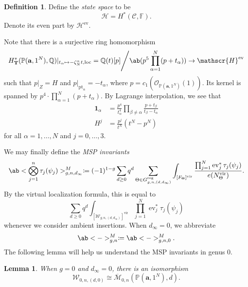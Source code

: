 \documentclass[10pt]{amsart}
\newtheorem{lem}[thm]{Lemma}
\theoremstyle{definition}
\newtheorem{defn}[thm]{Definition}
\theoremstyle{remark}
\theoremstyle{plain}
\theoremstyle{definition}
\theoremstyle{remark}
\newcommand{\Q}{\mathbb{Q}}
\newcommand{\F}{\mathbb{F}}
\newcommand{\ba}{\mathbf{a}}
\renewcommand{\P}{\mathbb{P}}
\newcommand{\mc}[1]{\mathcal{#1}}
\newcommand{\msc}[1]{\mathscr{#1}}
\newcommand{\T}{\mathbf{T}}
\newcommand{\mbf}[1]{\mathbf{#1}}
\newcommand{\mr}[1]{\mathrm{#1}}
\newcommand{\ol}[1]{\overline{#1}}
\newcommand{\1}{\mathbf{1}}
\newcommand{\2}{\mathbf{2}}
\newcommand{\3}{\mathbf{3}}
\newcommand{\vir}{\mr{vir}}
\newcommand{\pt}{\mr{pt}}
\newcommand{\loc}{\mr{loc}}
\DeclareMathOperator{\ev}{ev}
\numberwithin{equation}{section}
\begin{document}
\begin{defn}
    Define the \textit{state space} to be
    \[ \msc{H} = H^*(\mc{C}, \F). \]
    Denote its even part by $\msc{H}^{\ev}$.
\end{defn}

Note that there is a surjective ring homomorphism
\[ H_{\T}^*(\P(\ba, 1^N), \Q)|_{t_{\alpha} \mapsto -\zeta_N^{\alpha}t, \loc} = \Q(t)[p]\Bigg/\ab(p^5 \prod_{\alpha=1}^N (p+t_{\alpha})) \to \msc{H}^{\ev} \]
such that $p|_{Z} = H$ and $p|_{\pt_{\alpha}} = -t_{\alpha}$, where $p = c_1(\msc{O}_{\P(\ba, 1^N)}(1))$. Its kernel is spanned by $p^4 \cdot \prod_{\alpha=1}^N (p+t_{\alpha})$. By Lagrange interpolation, we see that
\begin{align*}
    \mbf{1}_{\alpha} &= \frac{p^4}{t_{\alpha}^4} \prod_{\beta \neq \alpha} \frac{p+t_{\beta}}{t_{\beta} - t_{\alpha}} \\
    H^j &= \frac{p^j}{t^N} (t^N - p^N)
\end{align*}
for all $\alpha = 1, \ldots, N$ and $j = 0, \ldots, 3$.

We may finally define the \textit{MSP invariants}
\[ \ab<\bigotimes_{j=1}^n \tau_j(\psi_j)>_{g,n,d_{\infty}}^M \coloneqq (-1)^{1-g}\sum_{d \geq 0} q^d \sum_{\Theta \in G_{g,n,(d,d_{\infty})}^{\mr{reg}}} \int_{[F_{\Theta}]^{\vir}}\frac{\prod_{j=1}^N \ev_j^*\tau_j(\psi_j)}{e(N_{\Theta}^{\vir})}. \]
By the virtual localization formula, this is equal to
\[ \sum_{d \geq 0}q^d \int_{[\msc{W}_{g,n,(d,d_{\infty})}]^{\vir}} \prod_{j=1}^N \ev_j^*\tau_j(\psi_j) \]
whenever we consider ambient insertions. When $d_{\infty} = 0$, we abbreviate
\[ \ab<->_{g,n}^M \coloneqq \ab<->_{g,n,0}^M. \]
The following lemma will help us understand the MSP invariants in genus $0$.

\begin{lem}\label{lem:genus0moduli}
    When $g=0$ and $d_{\infty} = 0$, there is an isomorphism
    \[ \msc{W}_{0,n,(d, 0)} \cong \ol{\msc{M}}_{0,n}(\P(\mbf{a}, 1^N), d). \]
\end{lem}
\end{document}
